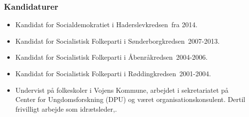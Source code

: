\documentclass[11pt, a4paper]{awesome-cv}
\begin{document}
\begin{cvletter}
\subsubsection*{Kandidaturer}
\begin{itemize}
\item Kandidat for Socialdemokratiet i Haderslevkredsen fra 2014.
\item Kandidat for Socialistisk Folkeparti i Sønderborgkredsen 2007-2013.
\item Kandidat for Socialistisk Folkeparti i Åbenråkredsen 2004-2006.
\item Kandidat for Socialistisk Folkeparti i Røddingkredsen 2001-2004.
\end{itemize}
\begin{itemize}
\item Undervist på folkeskoler i Vojens Kommune, arbejdet i sekretariatet på Center for Ungdomsforskning (DPU) og været organisationskonsulent. Dertil frivilligt arbejde som idrætsleder,.
\end{itemize}
\end{cvletter}
\end{document}
